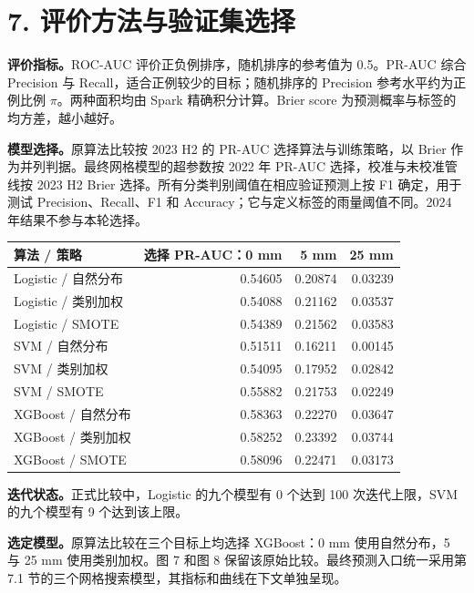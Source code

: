 \documentclass[UTF8,fontset=fandol,10pt,a4paper,landscape]{ctexart}
\begin{document}
\clearpage\section*{7. 评价方法与验证集选择}
\textbf{评价指标。}ROC-AUC 评价正负例排序，随机排序的参考值为 0.5。PR-AUC 综合 Precision 与 Recall，适合正例较少的目标；随机排序的 Precision 参考水平约为正例比例 $\pi$。两种面积均由 Spark 精确积分计算。Brier score 为预测概率与标签的均方差，越小越好。

\textbf{模型选择。}原算法比较按 2023 H2 的 PR-AUC 选择算法与训练策略，以 Brier 作为并列判据。最终网格模型的超参数按 2022 年 PR-AUC 选择，校准与未校准管线按 2023 H2 Brier 选择。所有分类判别阈值在相应验证预测上按 F1 确定，用于测试 Precision、Recall、F1 和 Accuracy；它与定义标签的雨量阈值不同。2024 年结果不参与本轮选择。

\begin{center}\begin{tabular}{lrrr}\toprule
算法 / 策略 & 选择 PR-AUC：0 mm & 5 mm & 25 mm\\\midrule
Logistic / 自然分布 & 0.54605 & 0.20874 & 0.03239\\
Logistic / 类别加权 & 0.54088 & 0.21162 & 0.03537\\
Logistic / SMOTE & 0.54389 & 0.21562 & 0.03583\\
SVM / 自然分布 & 0.51511 & 0.16211 & 0.00145\\
SVM / 类别加权 & 0.54095 & 0.17952 & 0.02842\\
SVM / SMOTE & 0.55882 & 0.21753 & 0.02249\\
XGBoost / 自然分布 & 0.58363 & 0.22270 & 0.03647\\
XGBoost / 类别加权 & 0.58252 & 0.23392 & 0.03744\\
XGBoost / SMOTE & 0.58096 & 0.22471 & 0.03173\\
\bottomrule\end{tabular}\end{center}

\textbf{迭代状态。}正式比较中，Logistic 的九个模型有 0 个达到 100 次迭代上限，SVM 的九个模型有 9 个达到该上限。

\textbf{选定模型。}原算法比较在三个目标上均选择 XGBoost：0 mm 使用自然分布，5 与 25 mm 使用类别加权。图 7 和图 8 保留该原始比较。最终预测入口统一采用第 7.1 节的三个网格搜索模型，其指标和曲线在下文单独呈现。
\end{document}
